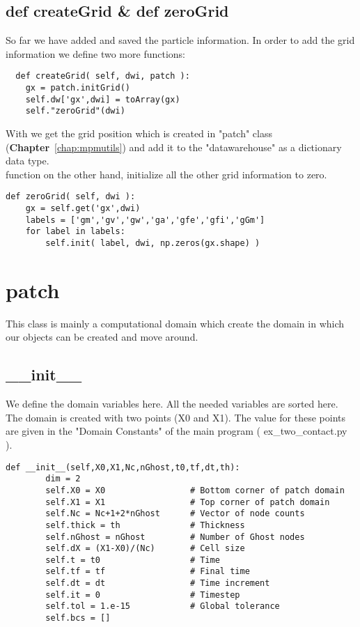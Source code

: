 \section{ def createGrid \& def zeroGrid}
So far we have added and saved the particle information. In order to add the grid information we define two more functions:
\begin{lstlisting}
  def createGrid( self, dwi, patch ):
	gx = patch.initGrid()
	self.dw['gx',dwi] = toArray(gx)
	self."zeroGrid"(dwi)
\end{lstlisting}
With  we get the grid position which is created in "patch" class (\textbf{Chapter}~\ref{chap:mpmutils}) and add it to the "datawarehouse" as a dictionary data type.\\ 
 function on the other hand, initialize all the other grid information to zero. 
\begin{lstlisting}
def zeroGrid( self, dwi ):
	gx = self.get('gx',dwi)
	labels = ['gm','gv','gw','ga','gfe','gfi','gGm']
	for label in labels:
	    self.init( label, dwi, np.zeros(gx.shape) )
\end{lstlisting}


\chapter{patch}
\label{chap:patch}
This class is mainly a computational domain which create the domain in which our objects can be created and move around. 
\section{\_\_init\_\_}
We define the domain variables here. All the needed variables are sorted here.
The domain is created with two points (X0 and X1). The value for these points are given in the "Domain Constants" of the main program ( ex\_two\_contact.py ).
\begin{lstlisting}
def __init__(self,X0,X1,Nc,nGhost,t0,tf,dt,th):
        dim = 2
        self.X0 = X0                 # Bottom corner of patch domain
        self.X1 = X1                 # Top corner of patch domain
        self.Nc = Nc+1+2*nGhost      # Vector of node counts
        self.thick = th              # Thickness
        self.nGhost = nGhost         # Number of Ghost nodes
        self.dX = (X1-X0)/(Nc)       # Cell size
        self.t = t0                  # Time
        self.tf = tf                 # Final time
        self.dt = dt                 # Time increment
        self.it = 0                  # Timestep
        self.tol = 1.e-15            # Global tolerance
        self.bcs = []
\end{lstlisting}  
